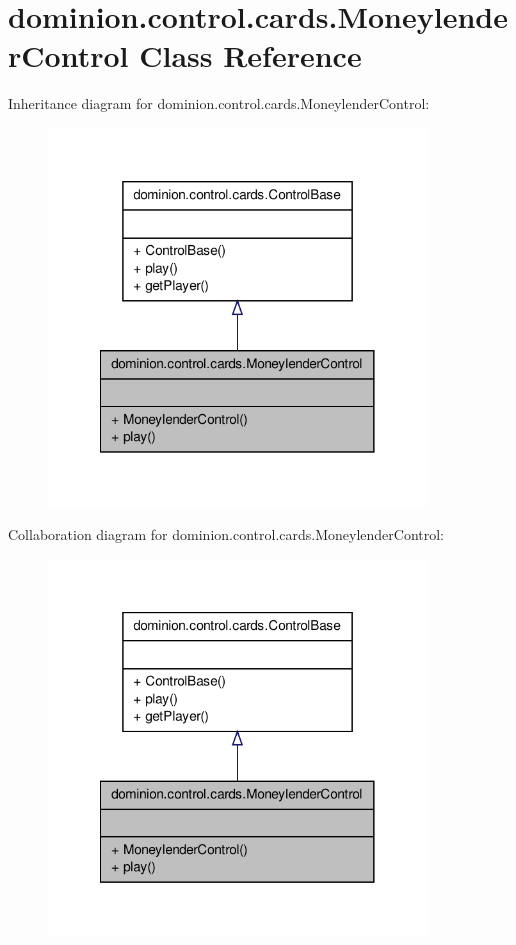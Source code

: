 \hypertarget{classdominion_1_1control_1_1cards_1_1MoneylenderControl}{\section{dominion.\-control.\-cards.\-Moneylender\-Control \-Class \-Reference}
\label{classdominion_1_1control_1_1cards_1_1MoneylenderControl}
}


\-Inheritance diagram for dominion.\-control.\-cards.\-Moneylender\-Control\-:
\nopagebreak
\begin{figure}[H]
\begin{center}
\leavevmode
\includegraphics[width=284pt]{classdominion_1_1control_1_1cards_1_1MoneylenderControl__inherit__graph}
\end{center}
\end{figure}


\-Collaboration diagram for dominion.\-control.\-cards.\-Moneylender\-Control\-:
\nopagebreak
\begin{figure}[H]
\begin{center}
\leavevmode
\includegraphics[width=284pt]{classdominion_1_1control_1_1cards_1_1MoneylenderControl__coll__graph}
\end{center}
\end{figure}
